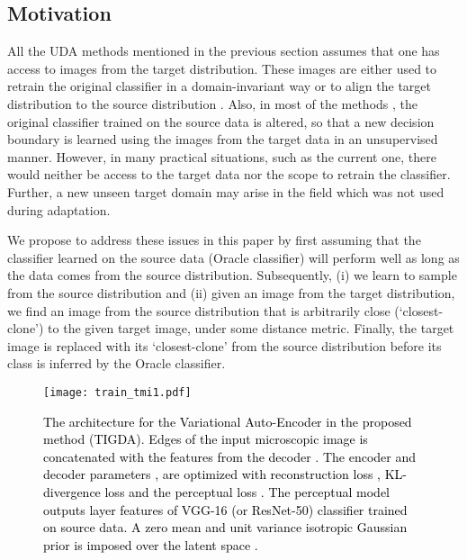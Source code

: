 \documentclass[journal,twoside,web]{IEEEtran}
\newcommand{\cc}{\textcolor{black}}
\begin{document}
\subsection{Motivation}
All the UDA methods mentioned in the previous section assumes that one has access to images from the target distribution. These images are either used to retrain the original classifier in a domain-invariant way \cite{tzeng2017adversarial,ganin2017domain,sankaranarayanan2018generate} or to align the target distribution to the source distribution \cite{hoffman2017cycada,bousmalis2017unsupervised,long2017deep,kang2019contrastive}. Also, in most of the methods \cite{tzeng2017adversarial,ganin2017domain,sankaranarayanan2018generate,kang2019contrastive}, the original classifier trained on the source data is altered, so that a new decision boundary is learned using the images from the target data in an unsupervised manner. However, in many practical situations, such as the current one, there would neither be access to the target data nor the scope to retrain the classifier. Further, a new unseen target domain may arise in the field which was not used during adaptation. \par We propose to address these issues in this paper by first assuming that the classifier learned on the source data (Oracle classifier) will perform well as long as the data comes from the source distribution. Subsequently, (i) we learn to sample from the source distribution and (ii) given an image from the target distribution, we find an image from the source distribution that is arbitrarily close (`closest-clone') to the given target image, under some distance metric. Finally, the target image is replaced with its `closest-clone' from the source distribution before its class is inferred by the Oracle classifier.

\setlength{\dbltextfloatsep}{0.2cm}
\begin{figure*}
\texttt{[image: train\_tmi1.pdf]}
\caption{\cc{The architecture for the Variational Auto-Encoder in the proposed method (TIGDA). Edges of the input microscopic image is concatenated with the features from the decoder . The encoder and decoder parameters ,  are optimized with reconstruction loss , KL-divergence loss  and the perceptual loss . The perceptual model  outputs  layer features of VGG-16 (or ResNet-50) classifier trained on source data. A zero mean and unit variance isotropic Gaussian prior is imposed over the latent space .}}
\label{fig:vaetrain}
\end{figure*}
\end{document}
